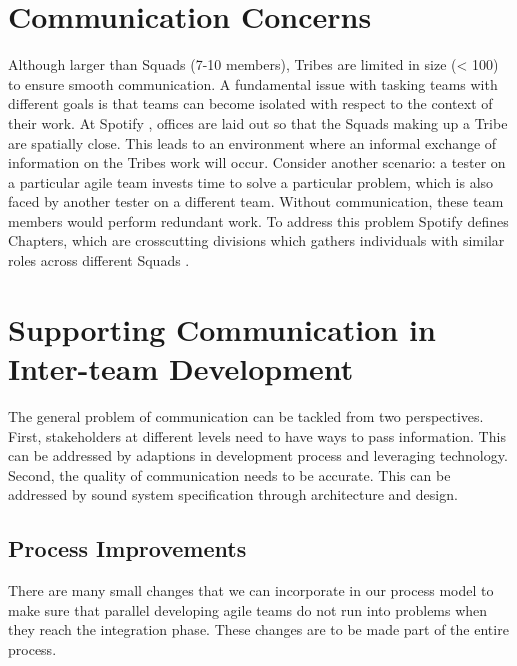 ﻿\section{Communication Concerns}\label{sec:spt_ex} 
Although larger than Squads (7-10 members), Tribes are limited in size (< 100) to ensure smooth communication.
A fundamental issue with tasking teams with different goals is that teams can become isolated with respect to the context of their work.
At Spotify \cite{kniberg12}, offices are laid out so that the Squads making up a Tribe are spatially close. This leads to an environment where an informal exchange of information on the Tribes work will occur.
Consider another scenario: a tester on a particular agile team invests time to solve a particular problem, which is also faced by another tester on a different team. Without communication, these team members would perform redundant work.
To address this problem Spotify defines Chapters, which are crosscutting divisions which gathers individuals with similar roles across different Squads  \cite{kniberg12}. 


\section{Supporting Communication in Inter-team Development}
\label{sec:prop_appro} 
The general problem of communication can be tackled from two perspectives.
First, stakeholders at different levels need to have ways to pass information.
This can be addressed by adaptions in development process and leveraging technology.
Second, the quality of communication needs to be accurate.
This can be addressed by sound system specification through architecture and design.

\subsection{Process Improvements} 
\label{sec:proc_impv}
	There are many small changes \cite{collabAcrossAgile_article} that we can incorporate in our process model to make sure that parallel developing agile teams do not run into problems when they reach the integration phase.
	These changes are to be made part of the entire process.

